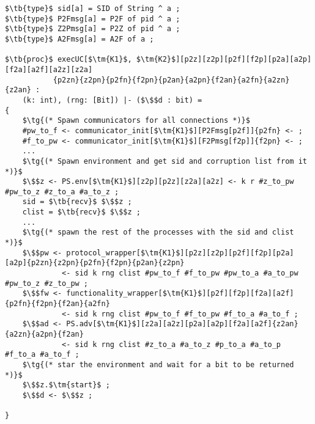 \begin{lstlisting}[basicstyle=\small\BeraMonottFamily, frame=single,  mathescape]
$\tb{type}$ sid[a] = SID of String ^ a ;
$\tb{type}$ P2Fmsg[a] = P2F of pid ^ a ;
$\tb{type}$ Z2Pmsg[a] = P2Z of pid ^ a ;
$\tb{type}$ A2Fmsg[a] = A2F of a ;

$\tb{proc}$ execUC[$\tm{K1}$, $\tm{K2}$][p2z][z2p][p2f][f2p][p2a][a2p][f2a][a2f][a2z][z2a]
           {p2zn}{z2pn}{p2fn}{f2pn}{p2an}{a2pn}{f2an}{a2fn}{a2zn}{z2an} : 
    (k: int), (rng: [Bit]) |- ($\$$d : bit) = 
{
    $\tg{(* Spawn communicators for all connections *)}$
    #pw_to_f <- communicator_init[$\tm{K1}$][P2Fmsg[p2f]]{p2fn} <- ;
    #f_to_pw <- communicator_init[$\tm{K1}$][F2Pmsg[f2p]]{f2pn} <- ;
    ...
    $\tg{(* Spawn environment and get sid and corruption list from it *)}$
    $\$$z <- PS.env[$\tm{K1}$][z2p][p2z][z2a][a2z] <- k r #z_to_pw #pw_to_z #z_to_a #a_to_z ;
    sid = $\tb{recv}$ $\$$z ;
    clist = $\tb{recv}$ $\$$z ;
    ...
    $\tg{(* spawn the rest of the processes with the sid and clist *)}$
    $\$$pw <- protocol_wrapper[$\tm{K1}$][p2z][z2p][p2f][f2p][p2a][a2p]{p2zn}{z2pn}{p2fn}{f2pn}{p2an}{z2pn} 
             <- sid k rng clist #pw_to_f #f_to_pw #pw_to_a #a_to_pw #pw_to_z #z_to_pw ;
    $\$$fw <- functionality_wrapper[$\tm{K1}$][p2f][f2p][f2a][a2f] {p2fn}{f2pn}{f2an}{a2fn}
             <- sid k rng clist #pw_to_f #f_to_pw #f_to_a #a_to_f ;
    $\$$ad <- PS.adv[$\tm{K1}$][z2a][a2z][p2a][a2p][f2a][a2f]{z2an}{a2zn}{a2pn}{f2an}
             <- sid k rng clist #z_to_a #a_to_z #p_to_a #a_to_p #f_to_a #a_to_f ;
    $\tg{(* star the environment and wait for a bit to be returned *)}$
    $\$$z.$\tm{start}$ ;
    $\$$d <- $\$$z ;

}
\end{lstlisting}
